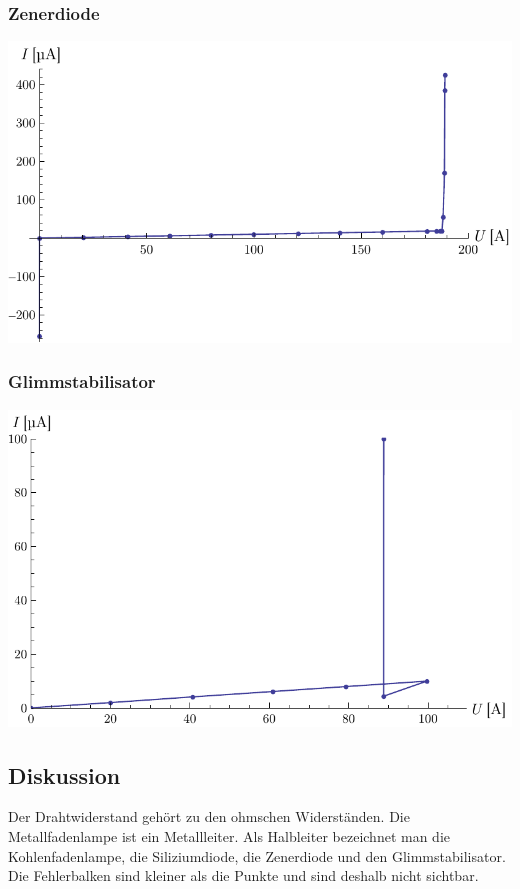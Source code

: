 \documentclass[12pt,a4paper]{article}
\begin{document}
\subsubsection*{Zenerdiode}
\includegraphics[width=15cm]{zenerdiode.pdf}

\subsubsection*{Glimmstabilisator}
\includegraphics[width=15cm]{glimmstabilisator.pdf}


\subsection*{Diskussion}
Der Drahtwiderstand geh\"ort zu den ohmschen Widerst\"anden. Die Metallfadenlampe ist ein Metallleiter.
Als Halbleiter bezeichnet man die Kohlenfadenlampe, die Siliziumdiode, die Zenerdiode und den Glimmstabilisator. Die Fehlerbalken sind kleiner als die Punkte und sind deshalb nicht sichtbar.
\end{document}
